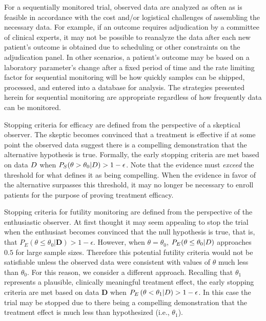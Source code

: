 \documentclass[AMA,STIX1COL,doublespace]{WileyNJD-v2}
\begin{document}
For a sequentially monitored trial, observed data are analyzed as often as is feasible in accordance with 
the cost and/or logistical challenges of assembling the necessary data.
%
For example, if an outcome requires adjudication by a committee of clinical experts, it may not be possible to reanalyze the
data after each new patient's outcome is obtained due to scheduling or other constraints on the adjudication panel.
%
In other scenarios, a patient's outcome may be based on a laboratory parameter's change after a fixed period of time
and the rate limiting factor for sequential monitoring will be how quickly samples can be shipped, processed, and entered
into a database for analysis.  
%
The strategies presented herein for sequential monitoring are appropriate regardless of how frequently data can be monitored.


Stopping criteria for efficacy are defined from the perspective of a skeptical observer. 
The skeptic becomes convinced that a treatment is effective if at some point the observed data suggest there is 
a compelling demonstration that the alternative hypothesis is true. 
Formally, the early stopping criteria are met based on data $\boldmath{D}$ when $P_S(\theta>\theta_0|\boldmath{D})>1-\epsilon$.
Note that the evidence must \textit{exceed} the threshold for what defines it as being compelling.
When the evidence in favor of the alternative surpasses this threshold, it may no longer be necessary to 
enroll patients for the purpose of proving treatment efficacy.


Stopping criteria for futility monitoring are defined from the perspective of the enthusiastic observer. At first thought it may seem appealing to stop the trial when the enthusiast becomes convinced that the
null hypothesis is true, that is, that $P_E(\theta\leq\theta_0|\mathbf{D})>1-\epsilon$. 
%
However, when $\theta=\theta_0$, $P_E(\theta\le\theta_0| \boldmath{D})$ approaches $0.5$ for large sample sizes. 
%
Therefore this potential futility criteria would not be satisfiable unless the observed data were consistent with values of
$\theta$ much less than $\theta_0$.
%
For this reason, we consider a different approach.
%
Recalling that $\theta_1$ represents a plausible, clinically meaningful treatment effect, the early stopping criteria are met based on data $\mathbf{D}$ when $P_E\left(\theta<\theta_1| \boldmath{D}\right)>1-\epsilon$. In this case the trial may be stopped due to there being a compelling demonstration that the treatment effect is much less than hypothesized (i.e., $\theta_1$).
%
\end{document}
